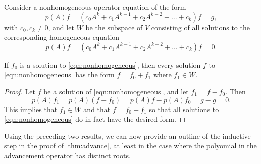 \begin{lemma}\label{lem:particular}
Consider a nonhomogeneous operator equation of the form
\begin{equation}\label{eqn:nonhomogeneous}
p(A)f= (c_0A^{k}+ c_1A^{k-1} + c_2A^{k-2} + \dots+c_k)f = g,
\end{equation}
with $c_0,c_k\neq0$,
and let $W$ be the subspace of $V$ consisting of all solutions
to the corresponding homogeneous equation
\begin{equation}\label{eqn:homogeneous}
p(A)f=(c_0A^{k}+ c_1A^{k-1} + c_2A^{k-2} + \dots+c_k)f = 0.
\end{equation}

If $f_0$ is a solution to \autoref{eqn:nonhomogeneous}, then every
solution $f$ to \autoref{eqn:nonhomogeneous} has the form
$f=f_0+f_1$ where $f_1\in W$.
\end{lemma}
\begin{proof}
Let $f$ be a solution of \autoref{eqn:nonhomogeneous}, and let
$f_1=f-f_0$.
Then
\[
p(A)f_1 = p(A)(f-f_0)=p(A)f-p(A)f_0=g-g=0.
\]
This implies that $f_1\in W$ and that $f=f_0+f_1$ so that all
solutions to \autoref{eqn:nonhomogeneous} do in fact have the desired
form.
\end{proof}

Using the preceding two results, we can now provide an outline of the
inductive step in the proof of \autoref{thm:advance}, at least in the
case where the polyomial in the advancement operator has distinct
roots.


